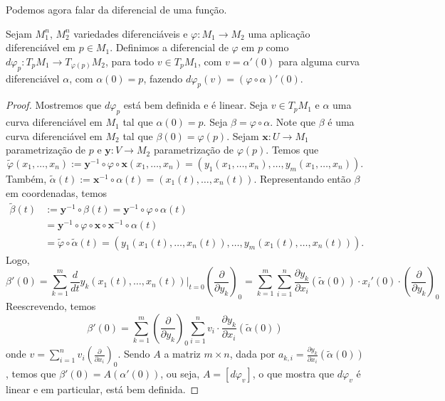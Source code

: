 	Podemos agora falar da diferencial de uma função.
	\begin{proposition}
		\label{prop:derivada-transformacao-linear}
		Sejam $M_{1}^{n}$, $M_{2}^{n}$ variedades diferenciáveis e $\varphi:M_{1}\to M_{2}$ uma aplicação diferenciável em $p \in M_{1}$. Definimos a diferencial de $\varphi$ em $p$ como $d\varphi_{p}:T_{p}M_{1}\to T_{\varphi (p)}M_{2}$, para todo $v \in T_{p}M_{1}$, com $v=\alpha'(0)$ para alguma curva diferenciável $\alpha$, com $\alpha(0)=p$, fazendo $d\varphi_{p}(v)= (\varphi \circ \alpha)'(0)$.
		\begin{proof}

			Mostremos que $d\varphi_{p}$ está bem definida e é linear.
			Seja $v \in T_{p}M_{1}$ e $\alpha$ uma curva diferenciável em $M_{1}$ tal que $\alpha(0)=p$. Seja $\beta = \varphi \circ \alpha$. Note que $\beta$ é uma curva diferenciável em $M_{2}$ tal que $\beta(0)=\varphi(p)$.
			Sejam $\mathbf{x}:U\to M_{1}$ parametrização de $p$ e $\mathbf{y}:V\to M_{2}$ parametrização de $\varphi(p)$. Temos que
			\begin{equation*}
				\tilde{\varphi}(x_{1}, \dots, x_{n}):=\mathbf{y}^{-1}\circ\varphi \circ \mathbf{x}(x_{1}, \dots, x_{n})=(y_{1}(x_{1}, \dots, x_{n}), \dots, y_{m}(x_{1}, \dots, x_{n})).
			\end{equation*}
			Também, $\tilde{\alpha}(t):=\mathbf{x}^{-1}\circ\alpha(t)=(x_{1}(t), \dots, x_{n}(t))$. Representando então $\beta$ em coordenadas, temos
			\begin{align*}
				\tilde{\beta}(t) & :=\mathbf{y}^{-1}\circ \beta(t)=\mathbf{y}^{-1} \circ  \varphi \circ \alpha(t)                                         \\
				                 & =\mathbf{y}^{-1} \circ  \varphi \circ  \mathbf{x} \circ \mathbf{x}^{-1} \circ \alpha(t)                                \\
				                 & =\tilde{\varphi} \circ  \tilde{\alpha}(t)=(y_{1}(x_{1}(t), \dots, x_{n}(t)), \dots, y_{m}(x_{1}(t), \dots, x_{n}(t))).
			\end{align*}
			Logo,
			\begin{equation*}
				\beta'(0)= \sum_{k=1}^{m}\frac{d}{dt}y_{k}(x_{1}(t), \dots, x_{n}(t))|_{t=0} \left( \frac{\partial}{\partial y_{k}} \right)_{0} = \sum _{k=1}^{m}\sum _{i=1}^{n}\frac{\partial y_{k}}{\partial x_{i}}(\tilde{\alpha}(0)) \cdot x_{i}'(0) \cdot \left( \frac{\partial}{\partial y_{k}} \right)_{0}
			\end{equation*}
			Reescrevendo, temos
			\begin{equation*}
				\beta'(0)=\sum _{k=1}^{m}\left( \frac{\partial}{\partial y_{k}} \right)_{0} \sum_{i=1}^{n}v_{i} \cdot \frac{\partial y_{k}}{\partial x_{i}}(\tilde{\alpha}(0))
			\end{equation*}
			onde $v = \sum_{i=1}^{n}v_{i}\left( \frac{\partial}{\partial x_{i}} \right)_{0}$.
			Sendo $A$ a matriz $m \times n$, dada por $a_{k,i}=\frac{\partial y_{k}}{\partial x_{i}}(\tilde{\alpha}(0))$, temos que $\beta'(0)=A(\alpha'(0))$, ou seja, $A = [d\varphi_{v}]$, o que mostra que $d\varphi_{v}$ é linear e em particular, está bem definida.
		\end{proof}
	\end{proposition}
